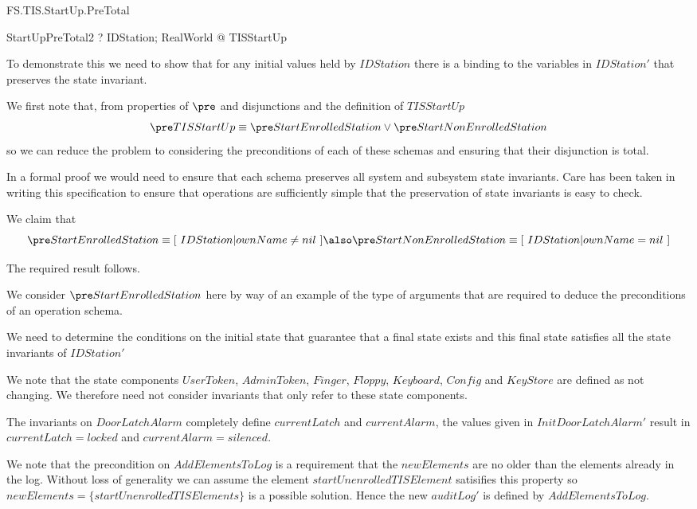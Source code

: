 \begin{Zpobtrace}{FS.TIS.StartUp.PreTotal}
\begin{theorem}{StartUpPreTotal2} \vdash? 
\forall IDStation; RealWorld @ \pre TISStartUp
\end{theorem}
\end{Zpobtrace}

To demonstrate this we need to show that for any initial values held
by $IDStation$ there is a binding to the variables in $IDStation'$
that preserves the state invariant.

We first note that, from properties of $\pre$ and disjunctions and the
definition of $TISStartUp$  
\[
\pre TISStartUp \equiv \pre StartEnrolledStation \lor \pre
StartNonEnrolledStation
\]
so we can reduce the problem to considering the preconditions of each
of these schemas and ensuring that their disjunction is total.

In a formal proof we would need to ensure that each schema preserves
all system and subsystem state invariants. Care has been taken in
writing this specification to ensure that operations are sufficiently
simple that the preservation of state invariants is easy to check.

We claim that 
\[
\pre StartEnrolledStation \equiv [~ IDStation | ownName \neq \Nil ~] 
\also
\pre StartNonEnrolledStation \equiv [~ IDStation | ownName = \Nil ~]
\]

The required result follows. 

We consider $\pre StartEnrolledStation$ here by way of an example of the
type of arguments that are required to deduce the preconditions of an
operation schema.

We need to determine the conditions on the initial state that
guarantee that a final state exists and this final state satisfies all
the state invariants of $IDStation'$

We note that the state components $UserToken$, $AdminToken$, $Finger$,
$Floppy$, $Keyboard$, $Config$ and $KeyStore$ are defined as not
changing. We therefore need not consider invariants that only refer to
these state components.

The invariants on $DoorLatchAlarm$ completely define $currentLatch$
and $currentAlarm$, the values given in $InitDoorLatchAlarm'$ result in
$currentLatch = locked$ and $currentAlarm = silenced$.

We note that the precondition on $AddElementsToLog$ is a requirement
that the $newElements$ are no older than the elements already in the
log. Without loss of generality we can assume the element
$startUnenrolledTISElement$ satisifies this property so $newElements =
\{ startUnenrolledTISElements \}$ is a possible solution. Hence the new
$auditLog'$ is defined by $AddElementsToLog$.


